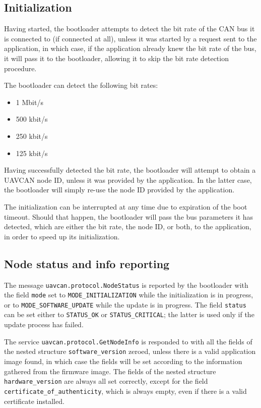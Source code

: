 \documentclass{zubaxdoc}
\begin{document}
\subsection{Initialization}

Having started, the bootloader attempts to detect the bit rate of the CAN bus it is connected to
(if connected at all), unless it was started by a request sent to the application, in which case,
if the application already knew the bit rate of the bus, it will pass it to the bootloader,
allowing it to skip the bit rate detection procedure.

The bootloader can detect the following bit rates:
\begin{itemize}
\item 1 Mbit/s
\item 500 kbit/s
\item 250 kbit/s
\item 125 kbit/s
\end{itemize}

Having successfully detected the bit rate, the bootloader will attempt to obtain a UAVCAN node ID,
unless it was provided by the application.
In the latter case, the bootloader will simply re-use the node ID provided by the application.

The initialization can be interrupted at any time due to expiration of the boot timeout.
Should that happen, the bootloader will pass the bus parameters it has detected,
which are either the bit rate, the node ID, or both, to the application,
in order to speed up its initialization.

\subsection{Node status and info reporting}

The message \verb|uavcan.protocol.NodeStatus| is reported by the bootloader with the field
\verb|mode| set to \verb|MODE_INITIALIZATION| while the initialization is in progress,
or to \verb|MODE_SOFTWARE_UPDATE| while the update is in progress.
The field \verb|status| can be set either to \verb|STATUS_OK| or \verb|STATUS_CRITICAL|;
the latter is used only if the update process has failed.

The service \verb|uavcan.protocol.GetNodeInfo| is responded to with all the fields of the nested structure
\verb|software_version| zeroed, unless there is a valid application image found,
in which case the fields will be set according to the information gathered from the firmware image.
The fields of the nested structure \verb|hardware_version| are always all set correctly,
except for the field \verb|certificate_of_authenticity|, which is always empty, even if there is
a valid certificate installed.
\end{document}
